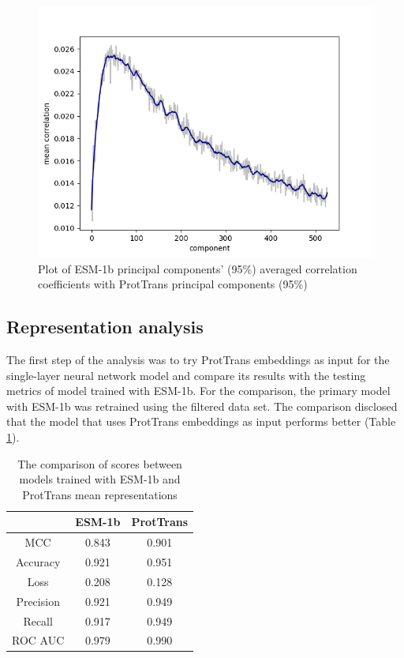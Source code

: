 \documentclass[12pt]{article}
\begin{document}
	\begin{figure}[h!]
		\centering
		\includegraphics[scale=0.85]{validation_small_set_2_joined_PC_95_correlation_mean.png}

		\caption{Plot of ESM-1b principal components' (95\%) averaged correlation 
		coefficients with ProtTrans principal components (95\%)}
		\label{figure:correlationComponentsMeanPC95}
	\end{figure}

	\newpage

	\subsection{Representation analysis}

	The first step of the analysis was to try ProtTrans embeddings 
	as input for the single-layer neural network model and compare 
	its results with the testing metrics of model trained with 
	ESM-1b. For the comparison, the primary model with ESM-1b was 
	retrained using the filtered data set. The comparison disclosed 
	that the model that uses ProtTrans embeddings as input performs 
	better (Table \ref{table:comparisonESMandPT}).

	\begin{table}[h!]
		\caption{The comparison of scores between models trained with ESM-1b
		and ProtTrans mean representations}
		\vspace{0.2cm}
		\centering
		\begin{tabular}{ | c | c c | }
			\hline 
						
			& ESM-1b & ProtTrans \\
			\hline 
			MCC & 0.843 & 0.901 \\
			Accuracy & 0.921 & 0.951 \\
			Loss & 0.208 & 0.128 \\
			Precision & 0.921 & 0.949 \\
			Recall & 0.917 & 0.949 \\
			ROC AUC & 0.979 & 0.990 \\
			\hline    
		\end{tabular}
		\label{table:comparisonESMandPT}
	\end{table}
\end{document}
